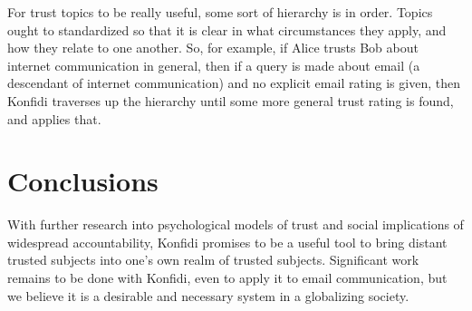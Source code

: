 \documentclass[letterpaper]{www2006-submission}
\begin{document}
For trust topics to be really useful, some sort of hierarchy is in order.  Topics ought to standardized so that it is clear in what circumstances they apply, and how they relate to one another.  So, for example, if Alice trusts Bob about internet communication in general, then if a query is made about email (a descendant of internet communication) and no explicit email rating is given, then Konfidi traverses up the hierarchy until some more general trust rating is found, and applies that.




\section{Conclusions}
With further research into psychological models of trust and social implications of widespread accountability, Konfidi promises to be a useful tool to bring distant trusted subjects into one's own realm of trusted subjects.  Significant work remains to be done with Konfidi, even to apply it to email communication, but we believe it is a desirable and necessary system in a globalizing society.
\end{document}
